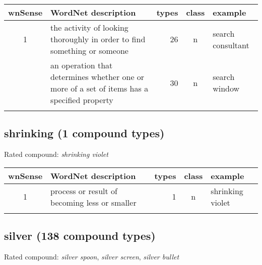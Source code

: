 \noindent
\begin{longtable}{c>{\raggedright\arraybackslash}p{5cm}rc>{\raggedright\arraybackslash}p{2cm}}\lsptoprule
{\small wnSense}&WordNet description&types&class&example\\\midrule
1&the activity of looking thoroughly in order to find something or
someone&26&n&search consultant\\\tablevspace
3&an operation that determines whether one or more of a set of items
has a specified property&30&n&search window\\\lspbottomrule
\end{longtable}

\subsection{shrinking   (1 compound types)}
Rated compound: \emph{shrinking violet}

\vspace*{1ex}

\noindent
\begin{longtable}{c>{\raggedright\arraybackslash}p{5cm}rc>{\raggedright\arraybackslash}p{2cm}}\lsptoprule
{\small wnSense}&WordNet description&types&class&example\\\midrule
1&process or result of becoming less or smaller&1&n&shrinking violet\\\lspbottomrule
\end{longtable}


\subsection{silver       (138 compound types)}
Rated compound: \emph{silver spoon}, \emph{silver screen},
\emph{silver bullet}


\vspace*{1ex}

